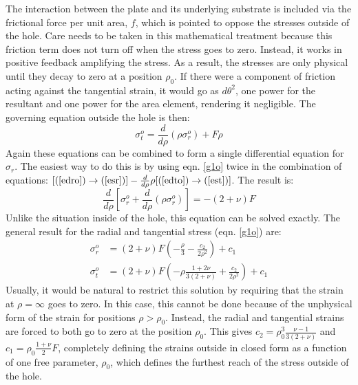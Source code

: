 The interaction between the plate and its underlying substrate is included via the frictional force per unit area, $f$, which is pointed to oppose the stresses outside of the hole.  Care needs to be taken in this mathematical treatment because this friction term does not turn off when the stress goes to zero.  Instead, it works in positive feedback amplifying the stress.  As a result, the stresses are only physical until they decay to zero at a position $\rho_0$.  If there were a component of friction acting against the tangential strain, it would go as $d \theta^2$, one power for the resultant and one power for the area element, rendering it negligible.  The governing equation outside the hole is then:
\begin{equation}
\sigma_t^o=\frac{d}{d\rho}(\rho \sigma_r^o)+F \rho
\label{g1o}
\end{equation}
Again these equations can be combined to form a single differential equation for $\sigma_r$.  The easiest way to do this is by using eqn. \ref{g1o} twice in the combination of equations: $[(\ref{edro}) \rightarrow (\ref{esr})]-\frac{d}{d \rho}\rho[(\ref{edto})\rightarrow(\ref{est})]$.  The result is:
\begin{equation}
\frac{d}{d\rho}[\sigma_r^o+\frac{d}{d\rho}(\rho \sigma_r^o)]=-(2+\nu) F
\label{comboout}
\end{equation}
Unlike the situation inside of the hole, this equation can be solved exactly.  The general result for the radial and tangential stress (eqn. \ref{g1o}) are:
\begin{align}
\sigma_r^o&=(2+\nu)F(-\frac{\rho}{3}-\frac{c_2}{2 \rho^2})+c_1 \\
\sigma_t^o&=(2+\nu)F(-\rho \frac{1+2 \nu}{3(2+\nu)}+\frac{c_2}{2 \rho^2})+c_1
\end{align}
Usually, it would be natural to restrict this solution by requiring that the strain at $\rho=\infty$ goes to zero.  In this case, this cannot be done because of the unphysical form of the strain for positions $\rho>\rho_0$.  Instead, the radial and tangential strains are forced to both go to zero at the position $\rho_0$.  This gives $c_2=\rho_0^3 \frac{\nu-1}{3(2+\nu)}$ and $c_1=\rho_0 \frac{1+\nu}{2} F$, completely defining the strains outside in closed form as a function of one free parameter, $\rho_0$, which defines the furthest reach of the stress outside of the hole.

